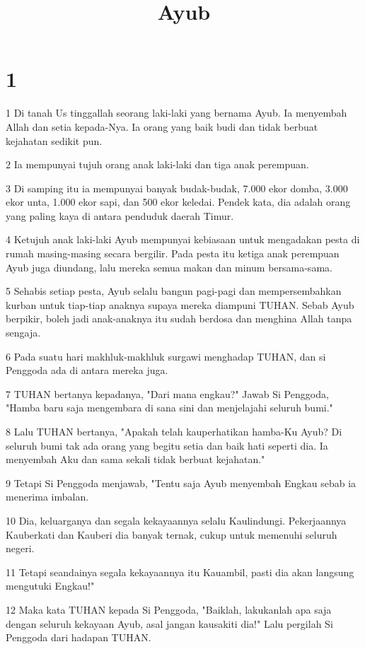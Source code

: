 

\title{Ayub}


\chapter{1}

\par 1 Di tanah Us tinggallah seorang laki-laki yang bernama Ayub. Ia menyembah Allah dan setia kepada-Nya. Ia orang yang baik budi dan tidak berbuat kejahatan sedikit pun.
\par 2 Ia mempunyai tujuh orang anak laki-laki dan tiga anak perempuan.
\par 3 Di samping itu ia mempunyai banyak budak-budak, 7.000 ekor domba, 3.000 ekor unta, 1.000 ekor sapi, dan 500 ekor keledai. Pendek kata, dia adalah orang yang paling kaya di antara penduduk daerah Timur.
\par 4 Ketujuh anak laki-laki Ayub mempunyai kebiasaan untuk mengadakan pesta di rumah masing-masing secara bergilir. Pada pesta itu ketiga anak perempuan Ayub juga diundang, lalu mereka semua makan dan minum bersama-sama.
\par 5 Sehabis setiap pesta, Ayub selalu bangun pagi-pagi dan mempersembahkan kurban untuk tiap-tiap anaknya supaya mereka diampuni TUHAN. Sebab Ayub berpikir, boleh jadi anak-anaknya itu sudah berdosa dan menghina Allah tanpa sengaja.
\par 6 Pada suatu hari makhluk-makhluk surgawi menghadap TUHAN, dan si Penggoda ada di antara mereka juga.
\par 7 TUHAN bertanya kepadanya, "Dari mana engkau?" Jawab Si Penggoda, "Hamba baru saja mengembara di sana sini dan menjelajahi seluruh bumi."
\par 8 Lalu TUHAN bertanya, "Apakah telah kauperhatikan hamba-Ku Ayub? Di seluruh bumi tak ada orang yang begitu setia dan baik hati seperti dia. Ia menyembah Aku dan sama sekali tidak berbuat kejahatan."
\par 9 Tetapi Si Penggoda menjawab, "Tentu saja Ayub menyembah Engkau sebab ia menerima imbalan.
\par 10 Dia, keluarganya dan segala kekayaannya selalu Kaulindungi. Pekerjaannya Kauberkati dan Kauberi dia banyak ternak, cukup untuk memenuhi seluruh negeri.
\par 11 Tetapi seandainya segala kekayaannya itu Kauambil, pasti dia akan langsung mengutuki Engkau!"
\par 12 Maka kata TUHAN kepada Si Penggoda, "Baiklah, lakukanlah apa saja dengan seluruh kekayaan Ayub, asal jangan kausakiti dia!" Lalu pergilah Si Penggoda dari hadapan TUHAN.
